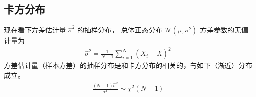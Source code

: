 \documentclass[letterpaper,10pt,english]{sphinxmanual}
\begin{document}
\subsection{卡方分布}
\label{\detokenize{_u63a8_u65ad_u4e0e_u68c0_u9a8c/content:id5}}
现在看下方差估计量 \(\hat{\sigma}^2\) 的抽样分布，
总体正态分布 \(\mathcal{N}(\mu,\sigma^2)\) 方差参数的无偏计量为
\begin{equation}\label{equation:推断与检验/content:eq_estimator_eval_017}
\begin{split} \hat{\sigma}^2 = \frac{1}{N-1} \sum_{i=1}^N (X_i-\bar{X})^2\end{split}
\end{equation}
方差估计量（样本方差）的抽样分布是和卡方分布的相关的，有如下（渐近）分布成立。
\begin{equation}\label{equation:推断与检验/content:推断与检验/content:9}
\begin{split}\frac{(N-1) \hat{\sigma}^2}{\sigma^2}  \sim  \chi^2(N-1)\end{split}
\end{equation}
\end{document}
